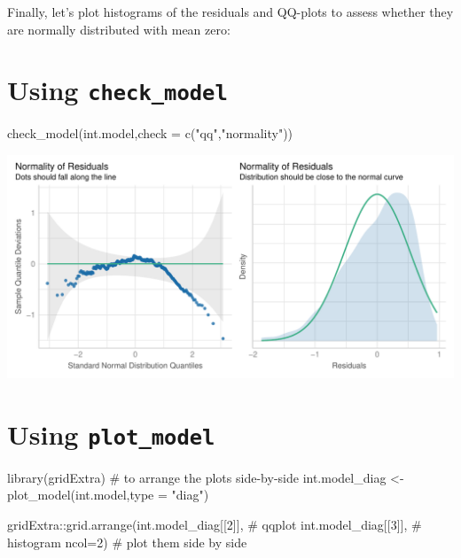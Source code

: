 \documentclass[
  letterpaper,
  DIV=11,
  numbers=noendperiod]{scrartcl}
\newenvironment{Shaded}{\begin{snugshade}}{\end{snugshade}}
\newcommand{\AttributeTok}[1]{\textcolor[rgb]{0.40,0.45,0.13}{#1}}
\newcommand{\CommentTok}[1]{\textcolor[rgb]{0.37,0.37,0.37}{#1}}
\newcommand{\DecValTok}[1]{\textcolor[rgb]{0.68,0.00,0.00}{#1}}
\newcommand{\FunctionTok}[1]{\textcolor[rgb]{0.28,0.35,0.67}{#1}}
\newcommand{\NormalTok}[1]{\textcolor[rgb]{0.00,0.23,0.31}{#1}}
\newcommand{\OtherTok}[1]{\textcolor[rgb]{0.00,0.23,0.31}{#1}}
\newcommand{\SpecialCharTok}[1]{\textcolor[rgb]{0.37,0.37,0.37}{#1}}
\newcommand{\StringTok}[1]{\textcolor[rgb]{0.13,0.47,0.30}{#1}}
\begin{document}
\newpage

Finally, let's plot histograms of the residuals and QQ-plots to assess
whether they are normally distributed with mean zero:

\section{\texorpdfstring{Using
\texttt{check\_model}}{Using check\_model}}

\begin{Shaded}
\begin{Highlighting}[]
\FunctionTok{check\_model}\NormalTok{(int.model,}\AttributeTok{check =} \FunctionTok{c}\NormalTok{(}\StringTok{"qq"}\NormalTok{,}\StringTok{"normality"}\NormalTok{))}
\end{Highlighting}
\end{Shaded}

\begin{center}
\includegraphics{notes_files/figure-pdf/unnamed-chunk-14-1.pdf}
\end{center}

\section{\texorpdfstring{Using \texttt{plot\_model}}{Using plot\_model}}

\begin{Shaded}
\begin{Highlighting}[]
\FunctionTok{library}\NormalTok{(gridExtra) }\CommentTok{\# to arrange the plots side{-}by{-}side}
\NormalTok{int.model\_diag }\OtherTok{\textless{}{-}} \FunctionTok{plot\_model}\NormalTok{(int.model,}\AttributeTok{type =} \StringTok{"diag"}\NormalTok{)}

\NormalTok{gridExtra}\SpecialCharTok{::}\FunctionTok{grid.arrange}\NormalTok{(int.model\_diag[[}\DecValTok{2}\NormalTok{]], }\CommentTok{\# qqplot}
\NormalTok{                        int.model\_diag[[}\DecValTok{3}\NormalTok{]], }\CommentTok{\# histogram}
                        \AttributeTok{ncol=}\DecValTok{2}\NormalTok{) }\CommentTok{\# plot them side by side}
\end{Highlighting}
\end{Shaded}
\end{document}
